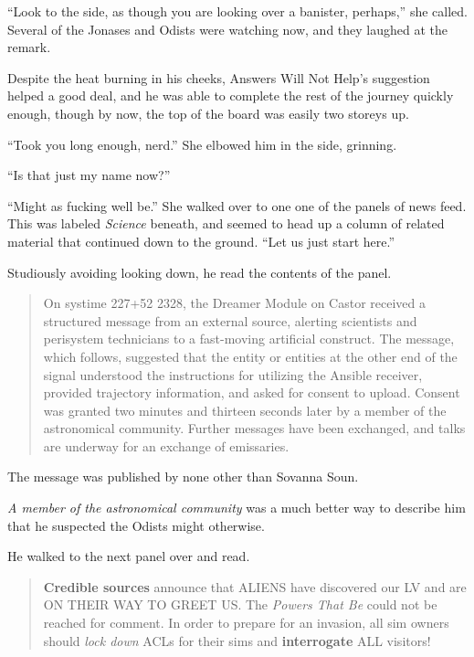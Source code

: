 ``Look to the side, as though you are looking over a banister, perhaps,'' she called. Several of the Jonases and Odists were watching now, and they laughed at the remark.

Despite the heat burning in his cheeks, Answers Will Not Help's suggestion helped a good deal, and he was able to complete the rest of the journey quickly enough, though by now, the top of the board was easily two storeys up.

``Took you long enough, nerd.'' She elbowed him in the side, grinning.

``Is that just my name now?''

``Might as fucking well be.'' She walked over to one one of the panels of news feed. This was labeled \emph{Science} beneath, and seemed to head up a column of related material that continued down to the ground. ``Let us just start here.''

Studiously avoiding looking down, he read the contents of the panel.

\begin{quote}
On systime 227+52 2328, the Dreamer Module on Castor received a structured message from an external source, alerting scientists and perisystem technicians to a fast-moving artificial construct. The message, which follows, suggested that the entity or entities at the other end of the signal understood the instructions for utilizing the Ansible receiver, provided trajectory information, and asked for consent to upload. Consent was granted two minutes and thirteen seconds later by a member of the astronomical community. Further messages have been exchanged, and talks are underway for an exchange of emissaries.
\end{quote}

The message was published by none other than Sovanna Soun.

\emph{A member of the astronomical community} was a much better way to describe him that he suspected the Odists might otherwise.

He walked to the next panel over and read.

\begin{quote}
\textbf{Credible sources} announce that ALIENS have discovered our LV and are ON THEIR WAY TO GREET US. The \emph{Powers That Be} could not be reached for comment. In order to prepare for an invasion, all sim owners should \emph{lock down} ACLs for their sims and \textbf{interrogate} ALL visitors!
\end{quote}

